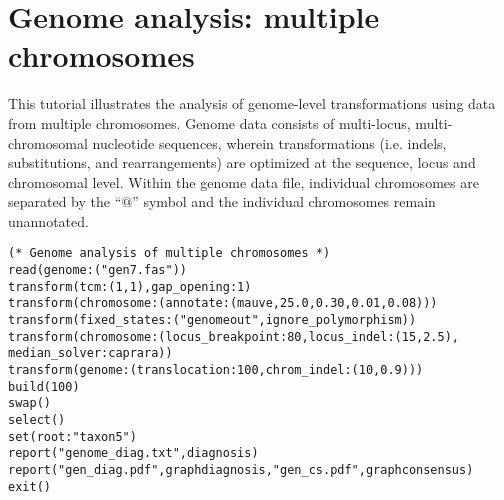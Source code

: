 
\section{Genome analysis: multiple chromosomes}{\label{tutorial11}}

This tutorial illustrates the analysis of genome-level transformations using data from multiple chromosomes. Genome 
data consists of multi-locus, multi-chromosomal nucleotide sequences, wherein transformations (i.e. indels, substitutions, and 
rearrangements) are optimized at the sequence, locus and chromosomal level.  Within the genome data file, individual 
chromosomes are separated by the ``$@$'' symbol and the individual chromosomes remain unannotated.

\begin{verbatim}
(* Genome analysis of multiple chromosomes *)
read(genome:("gen7.fas"))
transform(tcm:(1,1),gap_opening:1)
transform(chromosome:(annotate:(mauve,25.0,0.30,0.01,0.08)))
transform(fixed_states:("genomeout",ignore_polymorphism))
transform(chromosome:(locus_breakpoint:80,locus_indel:(15,2.5),
median_solver:caprara))
transform(genome:(translocation:100,chrom_indel:(10,0.9)))
build(100)
swap()
select()
set(root:"taxon5")
report("genome_diag.txt",diagnosis)
report("gen_diag.pdf",graphdiagnosis,"gen_cs.pdf",graphconsensus)
exit()
\end{verbatim}

